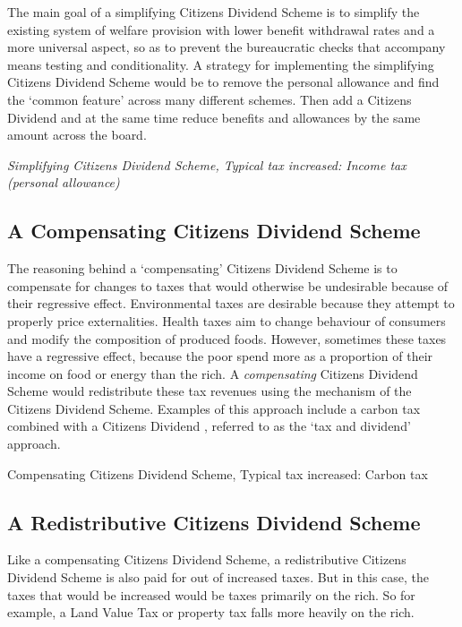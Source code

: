 \documentclass[]{tufte-handout}
\begin{document}
The main goal of a simplifying Citizens Dividend Scheme is to simplify
the existing system of welfare provision with lower benefit withdrawal
rates and a more universal aspect, so as to prevent the bureaucratic
checks that accompany means testing and conditionality. A strategy for
implementing the simplifying Citizens Dividend Scheme would be to remove
the personal allowance and find the `common feature' across many
different schemes. Then add a Citizens Dividend and at the same time
reduce benefits and allowances by the same amount across the board.

\emph{Simplifying Citizens Dividend Scheme, Typical tax increased:
Income tax (personal allowance)}

\hypertarget{a-compensating-citizens-dividend-scheme}{%
\subsection{A Compensating Citizens Dividend
Scheme}\label{a-compensating-citizens-dividend-scheme}}

The reasoning behind a `compensating' Citizens Dividend Scheme is to
compensate for changes to taxes that would otherwise be undesirable
because of their regressive effect. Environmental taxes are desirable
because they attempt to properly price externalities. Health taxes aim
to change behaviour of consumers and modify the composition of produced
foods. However, sometimes these taxes have a regressive effect, because
the poor spend more as a proportion of their income on food or energy
than the rich. A \emph{compensating} Citizens Dividend Scheme would
redistribute these tax revenues using the mechanism of the Citizens
Dividend Scheme. Examples of this approach include a carbon tax combined
with a Citizens Dividend , referred to as the `tax and dividend'
approach.

Compensating Citizens Dividend Scheme, Typical tax increased: Carbon tax

\hypertarget{a-redistributive-citizens-dividend-scheme}{%
\subsection{A Redistributive Citizens Dividend
Scheme}\label{a-redistributive-citizens-dividend-scheme}}

Like a compensating Citizens Dividend Scheme, a redistributive Citizens
Dividend Scheme is also paid for out of increased taxes. But in this
case, the taxes that would be increased would be taxes primarily on the
rich. So for example, a Land Value Tax or property tax falls more
heavily on the rich.
\end{document}
